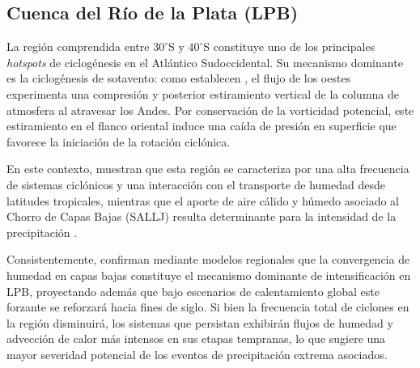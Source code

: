 \subsection{Cuenca del Río de la Plata (LPB)}\label{subsec:tb_lpb}
La región comprendida entre $30^\circ$S y $40^\circ$S constituye uno de los principales \textit{hotspots} de ciclogénesis en el Atlántico Sudoccidental. Su mecanismo dominante es la ciclogénesis de sotavento: como establecen \citet{gan1994influence}, el flujo de los oestes experimenta una compresión y posterior estiramiento vertical de la columna de atmosfera al atravesar los Andes. Por conservación de la vorticidad potencial, este estiramiento en el flanco oriental induce una caída de presión en superficie que favorece la iniciación de la rotación ciclónica. 

En este contexto, \citet{reboita2010south} muestran que esta región se caracteriza por una alta frecuencia de sistemas ciclónicos y una interacción con el transporte de humedad desde latitudes tropicales, mientras que el aporte de aire cálido y húmedo asociado al Chorro de Capas Bajas (SALLJ) resulta determinante para la intensidad de la precipitación \citep{crespo2020potential}.

Consistentemente, \citet{gramcianinov2024early} confirman mediante modelos regionales que la convergencia de humedad en capas bajas constituye el mecanismo dominante de intensificación en LPB, proyectando además que bajo escenarios de calentamiento global este forzante se reforzará hacia fines de siglo. Si bien la frecuencia total de ciclones en la región disminuirá, los sistemas que persistan exhibirán flujos de humedad y advección de calor más intensos en sus etapas tempranas, lo que sugiere una mayor severidad potencial de los eventos de precipitación extrema asociados.

